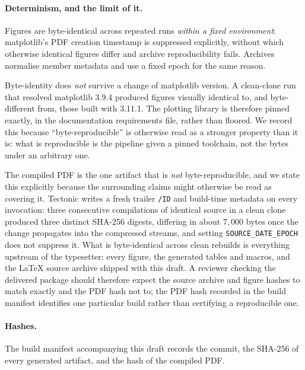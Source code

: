 \paragraph{Determinism, and the limit of it.}
Figures are byte-identical across repeated runs \emph{within a fixed
environment}: matplotlib's PDF creation timestamp is suppressed explicitly,
without which otherwise identical figures differ and archive reproducibility
fails. Archives normalise member metadata and use a fixed epoch for the same
reason.

Byte-identity does \emph{not} survive a change of matplotlib version. A
clean-clone run that resolved matplotlib 3.9.4 produced figures visually
identical to, and byte-different from, those built with 3.11.1. The plotting
library is therefore pinned exactly, in the documentation requirements file,
rather than floored. We record this
because ``byte-reproducible'' is otherwise read as a stronger property than it
is: what is reproducible is the pipeline given a pinned toolchain, not the bytes
under an arbitrary one.

The compiled PDF is the one artifact that is \emph{not} byte-reproducible, and
we state this explicitly because the surrounding claims might otherwise be read
as covering it. Tectonic writes a fresh trailer \texttt{/ID} and build-time
metadata on every invocation: three consecutive compilations of identical source
in a clean clone produced three distinct SHA-256 digests, differing in about
$7{,}000$ bytes once the change propagates into the compressed streams, and
setting \texttt{SOURCE\_DATE\_EPOCH} does not suppress it. What is byte-identical
across clean rebuilds is everything upstream of the typesetter: every figure,
the generated tables and macros, and the LaTeX source archive shipped with this
draft. A reviewer checking the delivered package should therefore expect the
source archive and figure hashes to match exactly and the PDF hash not to; the
PDF hash recorded in the build manifest identifies one particular build rather
than certifying a reproducible one.

\paragraph{Hashes.}
The build manifest accompanying this draft records the commit, the SHA-256 of
every generated artifact, and the hash of the compiled PDF.

